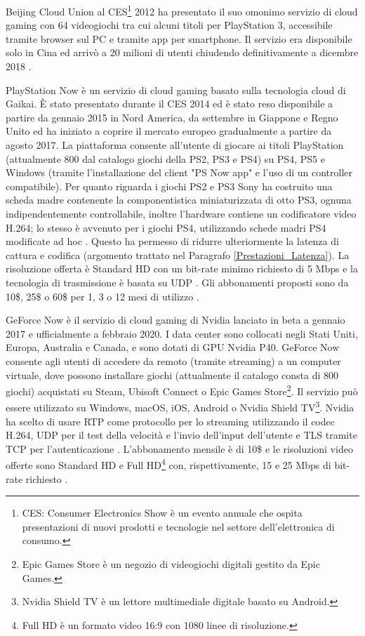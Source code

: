 Beijing Cloud Union al CES\footnote{CES: Consumer Electronics Show è un evento annuale che ospita presentazioni di nuovi prodotti e tecnologie nel settore dell'elettronica di consumo.} 2012 ha presentato il suo omonimo servizio di cloud gaming con 64 videogiochi tra cui alcuni titoli per PlayStation 3, accessibile tramite browser sul PC e tramite app per smartphone. Il servizio era disponibile solo in Cina ed arrivò a 20 milioni di utenti chiudendo definitivamente a dicembre 2018 \parencite{CloudUnion}.

PlayStation Now è un servizio di cloud gaming basato sulla tecnologia cloud di Gaikai. È stato presentato durante il CES 2014 ed è stato reso disponibile a partire da gennaio 2015 in Nord America, da settembre in Giappone e Regno Unito ed ha iniziato a coprire il mercato europeo gradualmente a partire da agosto 2017. La piattaforma consente all'utente di giocare ai titoli PlayStation (attualmente 800 dal catalogo giochi della PS2, PS3 e PS4) su PS4, PS5 e Windows (tramite l'installazione del client "PS Now app" e l'uso di un controller compatibile). Per quanto riguarda i giochi PS2 e PS3 Sony ha costruito una scheda madre contenente la componentistica miniaturizzata di otto PS3, ognuna indipendentemente controllabile, inoltre l'hardware contiene un codificatore video H.264; lo stesso è avvenuto per i giochi PS4, utilizzando schede madri PS4 modificate ad hoc \parencite{PlayStation_Now_Chip}. Questo ha permesso di ridurre ulteriormente la latenza di cattura e codifica (argomento trattato nel Paragrafo \ref{Prestazioni_Latenza}). La risoluzione offerta è Standard HD con un bit-rate minimo richiesto di 5 Mbps e la tecnologia di trasmissione è basata su UDP \parencite{A_Network_Analysis_on_Cloud_Gaming_Stadia_GeForce_Now_and_PSNow}. Gli abbonamenti proposti sono da 10\$, 25\$ o 60\$ per 1, 3 o 12 mesi di utilizzo \parencite{PlayStation_Now}.

GeForce Now è il servizio di cloud gaming di Nvidia lanciato in beta a gennaio 2017 e ufficialmente a febbraio 2020. I data center sono collocati negli Stati Uniti, Europa, Australia e Canada, e sono dotati di GPU Nvidia P40. GeForce Now consente agli utenti di accedere da remoto (tramite streaming) a un computer virtuale, dove possono installare giochi (attualmente il catalogo consta di 800 giochi) acquistati su Steam, Ubisoft Connect o Epic Games Store\footnote{Epic Games Store è un negozio di videogiochi digitali gestito da Epic Games.}. Il servizio può essere utilizzato su Windows, macOS, iOS, Android o Nvidia Shield TV\footnote{Nvidia Shield TV è un lettore multimediale digitale basato su Android.}.
Nvidia ha scelto di usare RTP come protocollo per lo streaming utilizzando il codec H.264, UDP per il test della velocità e l'invio dell'input dell'utente e TLS tramite TCP per l'autenticazione \parencite{A_Network_Analysis_on_Cloud_Gaming_Stadia_GeForce_Now_and_PSNow}. L'abbonamento mensile è di 10\$ e le risoluzioni video offerte sono Standard HD e Full HD\footnote{Full HD è un formato video 16:9 con 1080 linee di risoluzione.} con, rispettivamente, 15 e 25 Mbps di bit-rate richiesto \parencite{GeForce_Now}.

